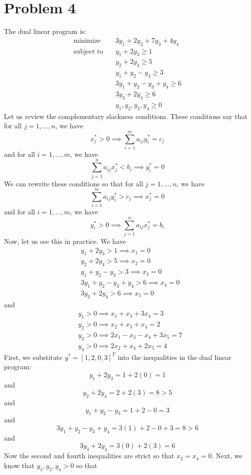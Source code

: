 \documentclass[12pt]{article}
\begin{document}
\section*{Problem 4}
The dual linear program is:
\begin{align*}
\text{minimize}\quad &3y_1 + 2y_2 + 7y_3 + 4y_4\\
\text{subject to}\quad & y_1 + 2y_3 \geq 1\\
& y_2 + 2y_4 \geq 5\\
& y_1 + y_2 - y_3 \geq 3\\
& 3y_1 + y_2 - y_3 + y_4 \geq 6\\
&  3y_3 + 2y_4 \geq 6\\
& y_1,y_2,y_3,y_4 \geq 0
\end{align*} Let us review the complementary slackness conditions. These conditions say that for all $j = 1,\ldots,n$, we have
\[
x^*_j > 0 \implies \sum_{i=1}^m a_{ij}y_i^* = c_j
\] and for all $i = 1,\ldots,m$, we have
\[
\sum_{j=1}^n a_{ij}x_j^* < b_i \implies y_i^* = 0
\] We can rewrite these conditions so that for all $j = 1,\ldots,n$, we have
\[
\sum_{i=1}^m a_{ij}y_i^* > c_j \implies x_j^* = 0
\] and for all $i = 1,\ldots,m$, we have
\[
y_i^* > 0 \implies \sum_{j=1}^n a_{ij} x_j^* = b_i
\] Now, let us see this in practice. We have
\begin{align*}
& y_1 + 2y_3 > 1 \implies x_1 = 0\\
& y_2 + 2y_4 > 5 \implies x_2 = 0\\
& y_1 + y_2 - y_3 > 3 \implies x_3 = 0\\
& 3y_1 + y_2 - y_3 + y_4 > 6 \implies x_4 = 0\\
&  3y_3 + 2y_4 > 6 \implies x_5 = 0
\end{align*} and
\begin{align*}
&y_1 > 0 \implies x_1 + x_3 + 3x_4 = 3\\
&y_2 > 0 \implies x_2 + x_3 + x_4 = 2\\
&y_3 > 0 \implies 2x_1 - x_3 - x_4 + 3x_5 = 7\\
&y_4 > 0 \implies 2x_2 + x_4 + 2x_5 = 4
\end{align*}
First, we substitute $y^* = [1,2,0,3]^T$ into the inequalities in the dual linear program:
\[
y_1 + 2y_3 = 1 + 2(0) = 1
\] and
\[
y_2 + 2y_4 = 2 + 2(3) = 8 > 5
\] and
\[
y_1 + y_2 - y_3 = 1 + 2 - 0 = 3
\] and
\[
3y_1 + y_2 - y_3 + y_4 = 3(1) + 2 - 0 + 3 = 8 > 6
\] and
\[
3y_3 + 2y_4 = 3(0) + 2(3) = 6
\] Now the second and fourth inequalities are strict so that $x_2 = x_4 = 0$. Next, we know that $y_1,y_2,y_4 > 0$ so that 
\end{document}
